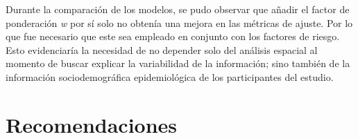 Durante la comparación de los modelos, se pudo observar que añadir el factor de ponderación \textit{w} por sí solo no obtenía una mejora en las métricas de ajuste. Por lo que fue necesario que este sea empleado en conjunto con los factores de riesgo. Esto evidenciaría la necesidad de no depender solo del análisis espacial al momento de buscar explicar la variabilidad de la información; sino también de la información sociodemográfica epidemiológica de los participantes del estudio.\\







\newpage
\section{Recomendaciones}

